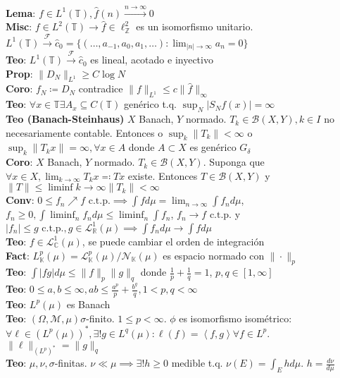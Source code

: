 \documentclass[9pt]{extarticle}
\newcommand{\C}{\mathbb{C}}
\newcommand{\R}{\mathbb{R}}
\newcommand{\K}{\mathbb{K}}
\newcommand{\Z}{\mathbb{Z}}
\newcommand{\T}{\mathbb{T}}
\newcommand{\F}{\mathcal{F}}
\newcommand{\inn}[1]{\left\langle #1\right\rangle}
\begin{document}
\begin{multicols*}{2}
\textbf{Lema}: $f\in L^1(\T),\hat f(n)\xrightarrow{n\to\infty}0$\\
\textbf{Misc}: $f\in L^2(\T)\to \hat f\in \ell^2_\Z$ es un isomorfismo unitario. $L^1(\T)\xrightarrow{\F} \hat c_0=\{(\ldots,a_{-1},a_0,a_1,\ldots):\lim_{|n|\to\infty} a_n=0\}$\\
\textbf{Teo}: $L^1(\T)\xrightarrow{\F}\hat c_0$ es lineal, acotado e inyectivo\\
\textbf{Prop}: $\|D_N\|_{L^1}\geq C\log N$\\
\textbf{Coro}: $f_N\coloneqq D_N$ contradice $\|f\|_{L^1}\leq c\|\hat f\|_{\infty}$\\
\textbf{Teo}: $\forall x\in\T\exists A_x\subseteq C(\T)$ genérico t.q. $\sup_N|S_N f(x)|=\infty$\\
\textbf{Teo (Banach-Steinhaus)} $X$ Banach, $Y$ normado. $T_k\in\mathcal{B}(X,Y),k\in I$ no necesariamente contable. Entonces o $\sup_{k}\|T_k\|<\infty$ o $\sup_k\|T_kx\|=\infty,\forall x\in A$ donde $A\subset X$ es genérico $G_\delta$\\
\textbf{Coro}: $X$ Banach, $Y$ normado. $T_k\in\mathcal{B}(X,Y)$. Suponga que $\forall x\in X, \lim_{k\to\infty} T_k x\eqqcolon Tx$ existe. Entonces $T\in\mathcal{B}(X,Y)$ y $\|T\|\leq \liminf{k\to\infty} \|T_k\|<\infty$\\
\textbf{Conv}: $0\leq f_n\nearrow f\text{ c.t.p.}\implies \int fd\mu=\lim_{n\to\infty}\int f_nd\mu$, $f_n\geq 0,\int\liminf_n f_nd\mu\leq\liminf_n\int f_n$, $f_n\to f\text{ c.t.p.}$ y $|f_n|\leq g\text{ c.t.p.},g\in \mathcal{L}^1_\R(\mu)\implies \int f_nd\mu\to\int fd\mu$\\
\textbf{Teo}: $f\in\mathcal{L}^1_\C(\mu)$, se puede cambiar el orden de integración\\
\textbf{Fact}: $L^p_\K(\mu)=\mathcal{L}_\K^p(\mu)/\mathcal{N}_\K(\mu)$ es espacio normado con $\|\cdot\|_p$\\
\textbf{Teo}: $\int |fg|d\mu\leq \|f\|_p\|g\|_q$ donde $\frac{1}{p}+\frac{1}{q}=1$, $p,q\in [1,\infty]$\\
\textbf{Teo}: $0\leq a,b\leq \infty, ab\leq \frac{a^p}{p}+\frac{b^q}{q},1<p,q<\infty$\\
\textbf{Teo}: $L^p(\mu)$ es Banach\\
\textbf{Teo}: $(\Omega,\mathcal{M},\mu) \sigma$-finito. $1\leq p<\infty$. $\phi$ es isomorfismo isométrico: $\forall\ell\in (L^p(\mu))^*,\exists!g\in L^q(\mu):\ell(f)=\inn{f,g}\forall f\in L^p$. $\|\ell\|_{(L^p)^*}=\|g\|_q$\\
\textbf{Teo}: $\mu,\nu,\sigma$-finitas. $\nu\ll\mu\implies \exists!h\geq 0$ medible t.q. $\nu(E)=\int_Ehd\mu$. $h=\frac{d\nu}{d\mu}$\\

\end{multicols*}
\end{document}

